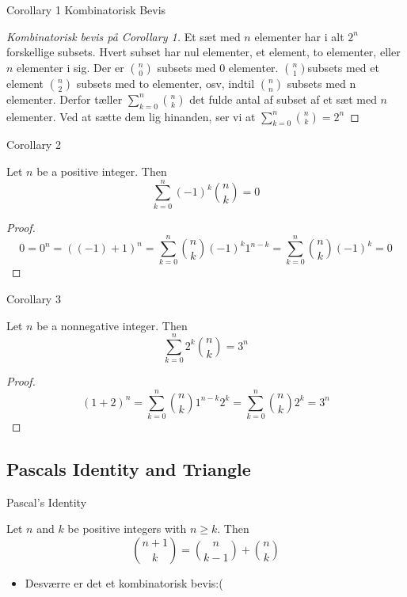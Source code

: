 \documentclass{beamer}
\begin{document}
\begin{frame}{Corollary 1 Kombinatorisk Bevis}
    \begin{proof}[Kombinatorisk bevis på Corollary 1]
        Et sæt med $n$ elementer har i alt $2^n$ forskellige subsets. Hvert subset har nul elementer, et element, to elementer, eller $n$ elementer i sig. Der er $\binom{n}{0}$ subsets med 0 elementer. $\binom{n}{1}$subsets med et element $\binom{n}{2}$ subsets med to elementer, osv, indtil $\binom{n}{n}$ subsets med n elementer. 
        Derfor tæller $\sum^n_{k=0} \binom{n}{k}$ det fulde antal af subset af et sæt med $n$ elementer. Ved at sætte dem lig hinanden, ser vi at $\sum_{k=0}^n \binom{n}{k} = 2^n$
    \end{proof}
\end{frame}

\begin{frame}{Corollary 2}
   \begin{corollary}[Corollary 2]
        Let $n$ be a positive integer. Then 
        $$\sum^n_{k=0}(-1)^k \binom{n}{k} = 0$$
   \end{corollary} 
   \begin{proof}
       $$0 = 0^n = ((-1)+1)^n = \sum^n_{k=0}\binom{n}{k}(-1)^k 1^{n-k} = \sum^n_{k=0}\binom{n}{k} (-1)^k = 0$$
   \end{proof}
\end{frame}

\begin{frame}{Corollary 3}
   \begin{corollary}[Corollary 3]
      Let $n$ be a nonnegative integer. Then
      $$\sum^n_{k=0}2^k \binom{n}{k} = 3^n$$
   \end{corollary} 
   \begin{proof}
       $$(1+2)^n = \sum^n_{k=0} \binom{n}{k} 1^{n-k}2^k = \sum^n_{k=0} \binom{n}{k} 2^k = 3^n$$
   \end{proof}
\end{frame}

\subsection{Pascals Identity and Triangle}

\begin{frame}{Pascal's Identity}
   \begin{theorem}
        Let $n$ and $k$ be positive integers with $n \geq k$. Then $$\binom{n+1}{k} = \binom{n}{k-1}+\binom{n}{k}$$ 
   \end{theorem} 
   \begin{itemize}
       \item Desværre er det et kombinatorisk bevis:( 
   \end{itemize}
\end{frame}
\end{document}
